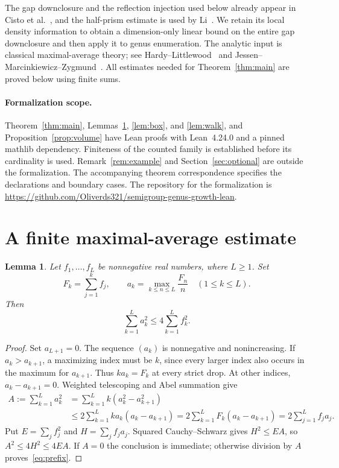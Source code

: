 \documentclass[11pt]{article}
\newtheorem{lemma}[theorem]{Lemma}
\theoremstyle{remark}
\begin{document}
The gap downclosure and the reflection injection used below already appear
in Cisto et al.~\cite[pp.~3--4 of the preprint]{CDF}, and the half-prism
estimate is used by Li~\cite[Proposition~35]{Li}. We retain its local
density information to obtain a dimension-only linear bound on the entire
gap downclosure and then apply it to genus enumeration. The analytic input
is classical maximal-average theory; see Hardy--Littlewood~\cite{HL} and
Jessen--Marcinkiewicz--Zygmund~\cite{JMZ}. All estimates needed for
Theorem~\ref{thm:main} are proved below using finite sums.

\paragraph{Formalization scope.}
Theorem~\ref{thm:main}, Lemmas~\ref{lem:prefix}, \ref{lem:box}, and
\ref{lem:walk}, and Proposition~\ref{prop:volume} have Lean proofs with
Lean~4.24.0 and a pinned mathlib dependency. Finiteness of the counted
family is established before its cardinality is used. Remark~\ref{rem:example}
and Section~\ref{sec:optional} are outside the formalization.
The accompanying theorem correspondence specifies the declarations and
boundary cases. The repository for the formalization is
\url{https://github.com/Oliverds321/semigroup-genus-growth-lean}.

\section{A finite maximal-average estimate}
\begin{lemma}\label{lem:prefix}
Let $f_1,\ldots,f_L$ be nonnegative real numbers, where $L\ge1$. Set
\[
 F_k=\sum_{j=1}^k f_j,\qquad
 a_k=\max_{k\le n\le L}\frac{F_n}{n}\quad(1\le k\le L).
\]
Then
\begin{equation}\label{eq:prefix}
 \sum_{k=1}^L a_k^2\le4\sum_{k=1}^L f_k^2.
\end{equation}
\end{lemma}
\begin{proof}
Set $a_{L+1}=0$. The sequence $(a_k)$ is nonnegative and nonincreasing.
If $a_k>a_{k+1}$, a maximizing index must be $k$, since every larger
index also occurs in the maximum for $a_{k+1}$. Thus $ka_k=F_k$ at
every strict drop. At other indices, $a_k-a_{k+1}=0$. Weighted
telescoping and Abel summation give
\begin{align*}
 A:=\sum_{k=1}^L a_k^2
 &=\sum_{k=1}^L k(a_k^2-a_{k+1}^2)\\
 &\le2\sum_{k=1}^L ka_k(a_k-a_{k+1})
 =2\sum_{k=1}^L F_k(a_k-a_{k+1})
 =2\sum_{j=1}^L f_ja_j.
\end{align*}
Put $E=\sum_j f_j^2$ and $H=\sum_j f_ja_j$. Squared
Cauchy--Schwarz gives $H^2\le EA$, so $A^2\le4H^2\le4EA$.
If $A=0$ the conclusion is immediate; otherwise division by $A$
proves~\eqref{eq:prefix}.
\end{proof}
\end{document}

